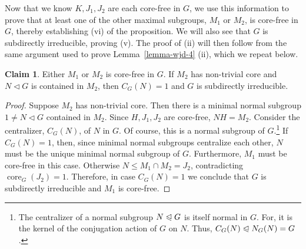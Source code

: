 \documentclass{gen-j-l}
\newcommand{\<}{\ensuremath{\langle}}
\renewcommand{\>}{\ensuremath{\rangle}}
\theoremstyle{plain}
\theoremstyle{definition}
\newcounter{claim}
\newtheorem{claim}[claim]{Claim}
\theoremstyle{remark}
\numberwithin{theorem}{section}
\numberwithin{claim}{section}
\numberwithin{equation}{section}
\numberwithin{conjecture}{section}
\renewcommand{\leq}{\ensuremath{\leqslant}}
\newcommand{\ssubnormal}{\ensuremath{\vartriangleleft}}
\newcommand{\subnormal}{\ensuremath{\trianglelefteqslant}}
\newcommand{\core}{\ensuremath{\operatorname{core}}}
\newcommand{\2}{\ensuremath{\mathbf{2}}}
\newcommand{\3}{\ensuremath{\mathbf{3}}}
\begin{document}
Now that we know $K, J_1, J_2$ are each core-free in $G$, we use this
information to prove that at least one of the other maximal subgroups, 
$M_1$ or $M_2$, is core-free in $G$, thereby establishing (vi) of the proposition.  
We will also see that $G$ is subdirectly irreducible, proving (v).  The proof of
(ii) will then follow from the same argument used to prove 
Lemma~\ref{lemma-wjd-4} (ii), which we repeat below.

\begin{claim}
  Either $M_1$ or $M_2$ is core-free in $G$.  If $M_2$ has non-trivial core
  and $N\ssubnormal G$ is contained in $M_2$, then
  $C_G(N)=1$ and $G$ is subdirectly irreducible.
\end{claim}
\begin{proof}
  Suppose $M_2$ has non-trivial core.  Then there is 
a minimal normal subgroup $1\neq N \ssubnormal G$ 
  contained in $M_2$. %
  Since $H, J_1, J_2$ are core-free, $NH=M_2$.  Consider the centralizer,
  $C_G(N)$, of $N$ in $G$.  Of course, this is a normal subgroup 
  of $G$.\footnote{The centralizer of a normal subgroup $N\subnormal G$ is itself
    normal in $G$.  For, it is the kernel of the conjugation action of $G$ on
    $N$. Thus, $C_G(N) \subnormal N_G(N) = G$.} 
If $C_G(N) = 1$, then, since minimal normal subgroups
  centralize each other, $N$ must be the unique minimal normal subgroup of $G$.
  Furthermore, $M_1$ must be core-free in this case.  Otherwise 
  $N\leq M_1 \cap M_2 = J_2$, contradicting $\core_G(J_2)=1$. 
  Therefore, in case $C_G(N) = 1$ we 
  conclude that $G$ is subdirectly irreducible and $M_1$ is core-free.


\end{proof}
\end{document}
